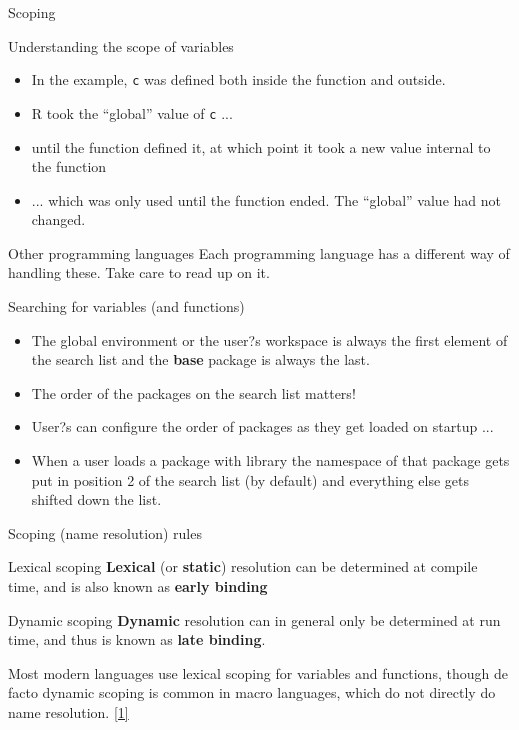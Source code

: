 \documentclass[xcolor=table,compress]{beamer}
\begin{document}
\begin{frame}{Scoping}
\begin{block}{Understanding the scope of variables}
\begin{itemize}[<+->]
\item In the example, \texttt{c} was defined both inside the function and outside. 
\item R took the ``global'' value of \texttt{c} ...
\item until the function defined it, at which point it took a new value internal to the function
\item ... which was only used until the function ended. The ``global'' value had not changed.
\end{itemize}
\end{block}
\begin{block}{Other programming languages}
Each programming language has a different way of handling these. Take care to read up on it.
\end{block}
\end{frame}




\begin{frame}{Searching for variables (and functions)}
\begin{itemize}
\item The global environment or the user?s workspace is always the first element of the search list and the \textbf{base} package is always the last.
\item The order of the packages on the search list matters!
\item User?s can configure the order of packages as they get loaded on startup ...
\item When a user loads a package with library the namespace of that package gets put in position 2 of the search list (by default) and everything else gets shifted down the list.
\end{itemize}
\end{frame}

\begin{frame}{Scoping (name resolution) rules}
\begin{block}{Lexical scoping}
\textbf{Lexical} (or \textbf{static}) resolution can be determined at compile time, and is also known as \textbf{early binding}
\end{block}
\begin{block}{Dynamic scoping}
\textbf{Dynamic} resolution can in general only be determined at run time, and thus is known as \textbf{late binding}. 
\end{block}
Most modern languages use lexical scoping for variables and functions, though de facto dynamic scoping is common in macro languages, which do not directly do name resolution. \href{http://en.wikipedia.org/wiki/Scope_(computer_science)}{[1]}
\end{frame}
\end{document}

